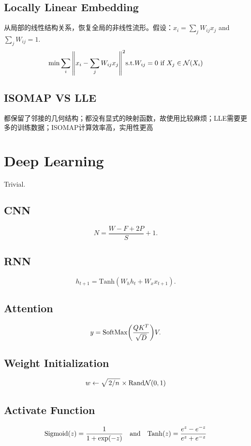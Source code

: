 \documentclass[a4paper,landscape]{article}
\begin{document}
\begin{tiny}
\begin{multicols}{4}
		\subsection{Locally Linear Embedding}
		从局部的线性结构关系，恢复全局的非线性流形。假设：$\hat{x}_i=\sum_jW_{ij}x_j$ and $\sum_j W_{ij}=1$.
		\[
			\min \sum_i\norm{x_i-\sum_jW_{ij}x_j}^2
			\text{s.t.} W_{ij}=0 \text{ if }X_j\in\mathcal{N}(X_i)
		\]

		\subsection{ISOMAP VS LLE}
		都保留了邻接的几何结构；都没有显式的映射函数，故使用比较麻烦；LLE需要更多的训练数据；ISOMAP计算效率高，实用性更高



		\section{Deep Learning}
		Trivial.
		\begin{md}

			\subsection{CNN}
			\[
				N=\frac{W-F+2P}{S}+1
				.\]

			\subsection{RNN}
			\[
				h_{t+1}=\mathrm{Tanh}(W_hh_t+W_xx_{t+1})
				.\]

			\subsection{Attention}
			\[
				y=\mathrm{SoftMax}\qty(\frac{QK^T}{\sqrt{D}})V
				.\]

			\subsection{Weight Initialization}
			\[w\gets \sqrt{\flatfrac{2}{n}}\times\mathrm{Rand}\+N(0,1)\]

			\subsection{Activate Function}
			\[
				\mathrm{Sigmoid}(z)=\frac{1}{1+\exp(-z)}
				\qand
				\mathrm{Tanh}(z)=\frac{e^z-e^{-z}}{e^z+e^{-z}}
			\]


\end{md}
\end{multicols}
\end{tiny}
\end{document}
